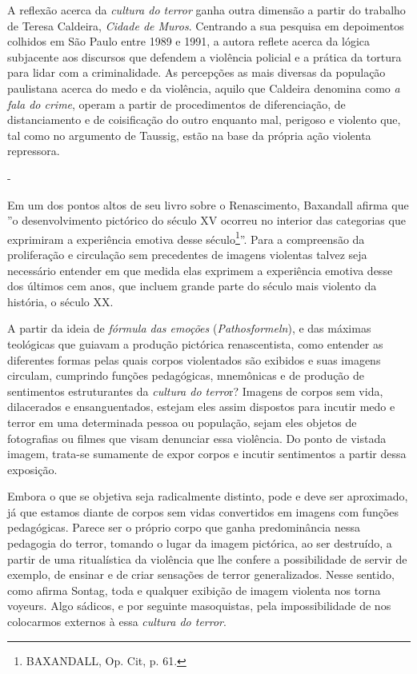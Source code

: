 A reflexão acerca da \emph{cultura do terror} ganha outra dimensão a
partir do trabalho de Teresa Caldeira, \emph{Cidade de Muros}. Centrando
a sua pesquisa em depoimentos colhidos em São Paulo entre 1989 e 1991, a
autora reflete acerca da lógica subjacente aos discursos que defendem a
violência policial e a prática da tortura para lidar com a
criminalidade. As percepções as mais diversas da população paulistana
acerca do medo e da violência, aquilo que Caldeira denomina como \emph{a
fala do crime}, operam a partir de procedimentos de diferenciação, de
distanciamento e de coisificação do outro enquanto mal, perigoso e
violento que, tal como no argumento de Taussig, estão na base da própria
ação violenta repressora.

-

Em um dos pontos altos de seu livro sobre o Renascimento, Baxandall
afirma que ''o desenvolvimento pictórico do século XV ocorreu no
interior das categorias que exprimiram a experiência emotiva desse
século\footnote{BAXANDALL, Op. Cit, p. 61.}''. Para a compreensão da
proliferação e circulação sem precedentes de imagens violentas talvez
seja necessário entender em que medida elas exprimem a experiência
emotiva desse dos últimos cem anos, que incluem grande parte do século
mais violento da história, o século XX.

A partir da ideia de \emph{fórmula das emoções} (\emph{Pathosformeln}),
e das máximas teológicas que guiavam a produção pictórica renascentista,
como entender as diferentes formas pelas quais corpos violentados são
exibidos e suas imagens circulam, cumprindo funções pedagógicas,
mnemônicas e de produção de sentimentos estruturantes da \emph{cultura
do terro}r? Imagens de corpos sem vida, dilacerados e ensanguentados,
estejam eles assim dispostos para incutir medo e terror em uma
determinada pessoa ou população, sejam eles objetos de fotografias ou
filmes que visam denunciar essa violência. Do ponto de vistada imagem,
trata-se sumamente de expor corpos e incutir sentimentos a partir dessa
exposição.

Embora o que se objetiva seja radicalmente distinto, pode e deve ser
aproximado, já que estamos diante de corpos sem vidas convertidos em
imagens com funções pedagógicas. Parece ser o próprio corpo que ganha
predominância nessa pedagogia do terror, tomando o lugar da imagem
pictórica, ao ser destruído, a partir de uma ritualística da violência
que lhe confere a possibilidade de servir de exemplo, de ensinar e de
criar sensações de terror generalizados. Nesse sentido, como afirma
Sontag, toda e qualquer exibição de imagem violenta nos torna voyeurs.
Algo sádicos, e por seguinte masoquistas, pela impossibilidade de nos
colocarmos externos à essa \emph{cultura do terror}.

